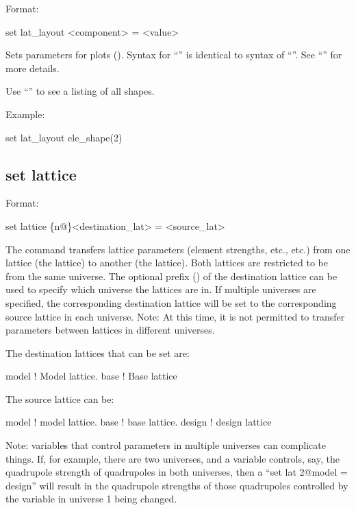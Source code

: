{{Format:
\begin{example}
  set lat_layout <component> = <value>
\end{example}

Sets parameters for  plots ().  Syntax for ``'' is
identical to syntax of ``''.  See ``'' for more details.

Use ``'' to see a listing of all shapes. 

Example:
\begin{example}
  set lat_layout ele_shape(2)%
\end{example}


\subsection{set lattice}
\label{s:set.lattice}

Format:
\begin{example}
  set lattice \{n@\}<destination_lat> = <source_lat>
\end{example}

The  command transfers lattice parameters (element strengths, etc., etc.)
from one lattice (the  lattice) to another (the  lattice). Both
lattices are restricted to be from the same universe. The optional  prefix
() of the destination lattice can be used to specify which universe the
lattices are in. If multiple universes are specified, the corresponding destination
lattice will be set to the corresponding source lattice in each universe. Note: At this
time, it is not permitted to transfer parameters between lattices in different universes.

The destination lattices that can be set are:
\begin{example}
  model      ! Model lattice.
  base       ! Base lattice
\end{example}
The source lattice can be:
\begin{example}
  model       ! model lattice.
  base        ! base lattice.
  design      ! design lattice
\end{example}

Note: \tao variables that control parameters in multiple universes can complicate
things. If, for example, there are two universes, and a \tao variable controls, say, the
quadrupole strength of quadrupoles in both universes, then a ``set lat 2@model = design''
will result in the quadrupole strengths of those quadrupoles controlled by the variable in
universe 1 being changed.

}}
